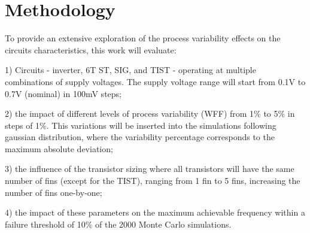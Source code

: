 \documentclass[pgmicro,mestrado,english]{iiufrgs}
\begin{document}


\chapter{Methodology}

To provide an extensive exploration of the process variability effects on the circuits characteristics, this work will evaluate: 

1) Circuits - inverter, 6T ST, SIG, and TIST - operating at multiple combinations of supply voltages. The supply voltage range will start from 0.1V to 0.7V (nominal) in 100mV steps;

 2) the impact of different levels of process variability (WFF) from 1\% to 5\% in steps of 1\%. This variations will be inserted into the simulations following gaussian distribution, where the variability percentage corresponds to the maximum absolute deviation;

 3) the influence of the transistor sizing where all transistors will have the same number of fins (except for the TIST), ranging from 1 fin to 5 fins, increasing the number of fins one-by-one;

4) the impact of these parameters on the maximum achievable frequency within a failure threshold of 10\% of the 2000 Monte Carlo simulations.
\end{document}

